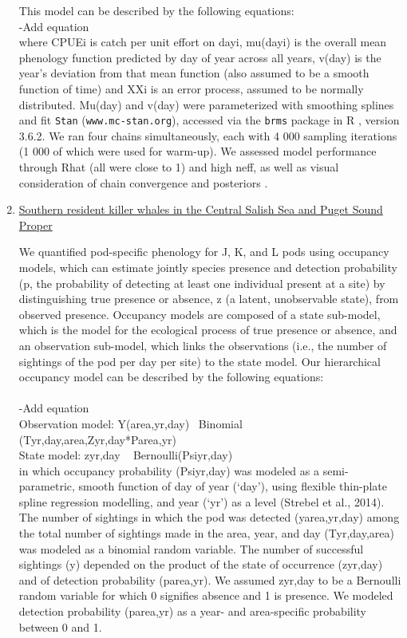 \documentclass{article}
\begin{document}
\begin{enumerate}
This model can be described by the following equations:
\\-Add equation
\\where CPUEi is catch per unit effort on dayi, mu(dayi) is the overall mean phenology function predicted by day of year across all years, v(day) is the year's deviation from that mean function (also assumed to be a smooth function of time) and XXi is an error process, assumed to be normally distributed. Mu(day) and v(day) were parameterized with smoothing splines and fit \texttt{Stan} \citep{Carpenter:2016aa} (\texttt{www.mc-stan.org}), accessed via the \texttt{brms}\citep{brms2017,brms2018} package in R \citep{Rcore2019}, version 3.6.2. We ran four chains simultaneously, each with 4 000 sampling iterations (1 000 of which were used for warm-up). We assessed model performance through Rhat (all were close to 1) and high neff, as well as visual consideration of chain convergence and posteriors \citep{BDA}.
\item \underline{Southern resident killer whales in the Central Salish Sea and Puget Sound Proper}
\par We quantified pod-specific phenology for J, K, and L pods using occupancy models, which can estimate jointly species presence and detection probability (p, the probability of detecting at least one individual present at a site) by distinguishing true presence or absence, z (a latent, unobservable state), from observed presence. Occupancy models are composed of a state sub-model, which is the model for the ecological process of true presence or absence, and an observation sub-model, which links the observations (i.e., the number of sightings of the pod per day per site) to the state model. Our hierarchical occupancy model can be described by the following equations:\\
 \\-Add equation
\\
Observation model: Y(area,yr,day)~ Binomial (Tyr,day,area,Zyr,day*Parea,yr)\\
State model: zyr,day ~ Bernoulli(Psiyr,day)\\
                                                                                                                                             
in which occupancy probability (Psiyr,day) was modeled as a semi-parametric, smooth function of day of year (‘day’), using flexible thin-plate spline regression modelling, and year (‘yr’) as a level (Strebel et al., 2014). The number of sightings in which the pod was detected (yarea,yr,day) among the total number of sightings made in the area, year, and day (Tyr,day,area) was modeled as a binomial random variable. The number of successful sightings (y) depended on the product of the state of occurrence (zyr,day) and of detection probability (parea,yr). We assumed zyr,day to be a Bernoulli random variable for which 0 signifies absence and 1 is presence. We modeled detection probability (parea,yr) as a year- and area-specific probability between 0 and 1.
 

\end{enumerate}
\end{document}

